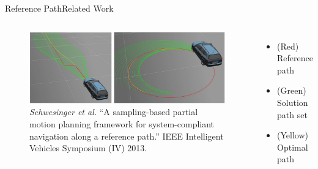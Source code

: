 \begin{frame}{Reference Path}{Related Work}

\begin{columns}
\begin{figure}
	\centering
	\includegraphics[width=\linewidth]{figure/interactive_path_planning2}
	\caption{\tiny {\it Schwesinger et al.} ``A sampling-based partial motion planning framework for system-compliant navigation along a reference path.'' IEEE Intelligent Vehicles Symposium (IV) 2013.}
\end{figure}

\begin{itemize}
\item (Red) Reference path
\item (Green) Solution path set
\item (Yellow) Optimal path
\end{itemize}

\end{columns}

\end{frame}

